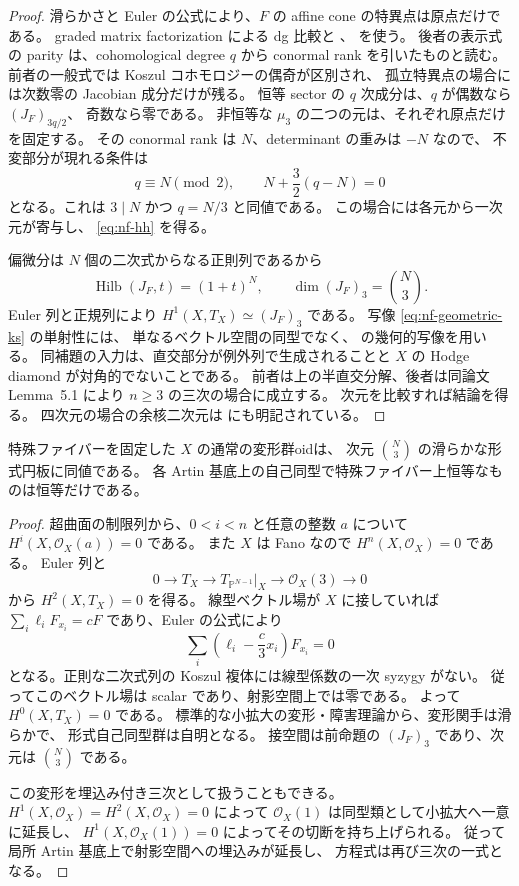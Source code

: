 \begin{proof}
滑らかさと Euler の公式により、$F$ の affine cone の特異点は原点だけである。
graded matrix factorization による dg 比較と
\cite[Theorem~5.39 の一般式とその証明]{NFBFKKernels}、
\cite[Theorem~3.5]{NFLZSerre} を使う。
後者の表示式の parity は、cohomological degree $q$ から conormal rank を引いたものと読む。
前者の一般式では Koszul コホモロジーの偶奇が区別され、
孤立特異点の場合には次数零の Jacobian 成分だけが残る。
恒等 sector の $q$ 次成分は、$q$ が偶数なら $(J_F)_{3q/2}$、
奇数なら零である。
非恒等な $\mu_3$ の二つの元は、それぞれ原点だけを固定する。
その conormal rank は $N$、determinant の重みは $-N$ なので、
不変部分が現れる条件は
\[
 q\equiv N\pmod2,\qquad
 N+\frac32(q-N)=0
\]
となる。これは $3\mid N$ かつ $q=N/3$ と同値である。
この場合には各元から一次元が寄与し、
\eqref{eq:nf-hh} を得る。

偏微分は $N$ 個の二次式からなる正則列であるから
\[
 \operatorname{Hilb}(J_F,t)=(1+t)^N,\qquad
 \dim(J_F)_3=\binom N3.
\]
Euler 列と正規列により
$H^1(X,T_X)\simeq(J_F)_3$ である。
写像 \eqref{eq:nf-geometric-ks} の単射性には、
単なるベクトル空間の同型でなく、
\cite[Lemma~5.2]{NFPirozhkov} の幾何的写像を用いる。
同補題の入力は、直交部分が例外列で生成されることと
$X$ の Hodge diamond が対角的でないことである。
前者は上の半直交分解、後者は同論文 Lemma~5.1 により $n\geq3$ の三次の場合に成立する。
次元を比較すれば結論を得る。
四次元の場合の余核二次元は
\cite[Remark~3.8 and the proof of Proposition~3.5]{NFHuybrechtsRennemo}
にも明記されている。
\end{proof}

\begin{lemma}[三次超曲面の通常の変形空間]
\label{lem:nf-geometric-smooth}
特殊ファイバーを固定した $X$ の通常の変形群oidは、
次元 $\binom N3$ の滑らかな形式円板に同値である。
各 Artin 基底上の自己同型で特殊ファイバー上恒等なものは恒等だけである。
\end{lemma}

\begin{proof}
超曲面の制限列から、$0<i<n$ と任意の整数 $a$ について
$H^i(X,\mathcal O_X(a))=0$ である。
また $X$ は Fano なので $H^n(X,\mathcal O_X)=0$ である。
Euler 列と
\[
 0\longrightarrow T_X\longrightarrow
 T_{\mathbb P^{N-1}}|_X\longrightarrow\mathcal O_X(3)
 \longrightarrow0
\]
から $H^2(X,T_X)=0$ を得る。
線型ベクトル場が $X$ に接していれば
$\sum_i\ell_iF_{x_i}=cF$ であり、Euler の公式により
\[
 \sum_i\left(\ell_i-\frac c3x_i\right)F_{x_i}=0
\]
となる。正則な二次式列の Koszul 複体には線型係数の一次 syzygy がない。
従ってこのベクトル場は scalar であり、射影空間上では零である。
よって $H^0(X,T_X)=0$ である。
標準的な小拡大の変形・障害理論から、変形関手は滑らかで、
形式自己同型群は自明となる。
接空間は前命題の $(J_F)_3$ であり、次元は $\binom N3$ である。

この変形を埋込み付き三次として扱うこともできる。
$H^1(X,\mathcal O_X)=H^2(X,\mathcal O_X)=0$ によって
$\mathcal O_X(1)$ は同型類として小拡大へ一意に延長し、
$H^1(X,\mathcal O_X(1))=0$ によってその切断を持ち上げられる。
従って局所 Artin 基底上で射影空間への埋込みが延長し、
方程式は再び三次の一式となる。
\end{proof}

